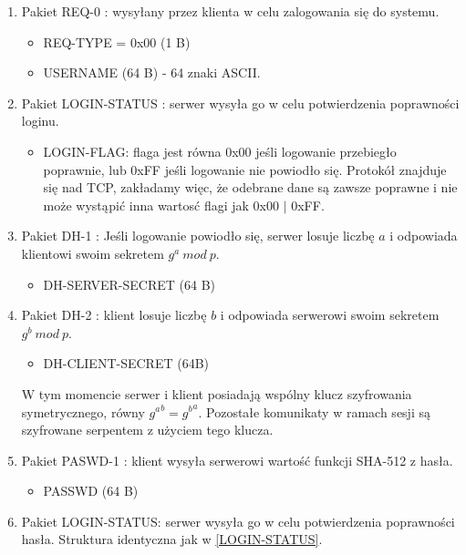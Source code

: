 \documentclass{article}
\begin{document}
	\begin{enumerate}
		\item Pakiet REQ-0 \label{REQ-0}: wysyłany przez klienta w celu zalogowania się do systemu. 
		\begin{itemize}
			\item REQ-TYPE = 0x00 (1 B)
			\item USERNAME (64 B) - 64 znaki ASCII. 
		\end{itemize}
	
		\item Pakiet LOGIN-STATUS \label{LOGIN-STATUS}: serwer wysyła go w celu potwierdzenia poprawności loginu. 
		\begin{itemize}
			\item LOGIN-FLAG: flaga jest równa 0x00 jeśli logowanie przebiegło poprawnie, lub 0xFF jeśli logowanie nie powiodło się. Protokół znajduje się nad TCP, zakładamy więc, że odebrane dane są zawsze poprawne i nie może wystąpić inna wartosć flagi jak 0x00 $|$ 0xFF. 
		\end{itemize}
	
		\item Pakiet DH-1 \label{DH-1}: Jeśli logowanie powiodło się, serwer losuje liczbę $a$ i odpowiada klientowi swoim sekretem $g^a\ mod\ p$. 
		\begin{itemize}
			\item DH-SERVER-SECRET (64 B)
		\end{itemize}
	
		\item Pakiet DH-2 \label{DH-2}: klient losuje liczbę $b$ i odpowiada serwerowi swoim sekretem $g^b\ mod\ p$. 
		\begin{itemize}
			\item DH-CLIENT-SECRET (64B)
		\end{itemize}
		W tym momencie serwer i klient posiadają wspólny klucz szyfrowania symetrycznego, równy ${g^a}^b={g^b}^a$. Pozostałe komunikaty w ramach sesji są szyfrowane serpentem z użyciem tego klucza. 
		
		\item Pakiet PASWD-1 \label{PASWD-1}: klient wysyła serwerowi wartość funkcji SHA-512 z hasła. 
		\begin{itemize}
			\item PASSWD (64 B)
		\end{itemize}
	
		\item Pakiet LOGIN-STATUS: serwer wysyła go w celu potwierdzenia poprawności hasła. Struktura identyczna jak w \ref{LOGIN-STATUS}. 	
		
	\end{enumerate}
\end{document}

